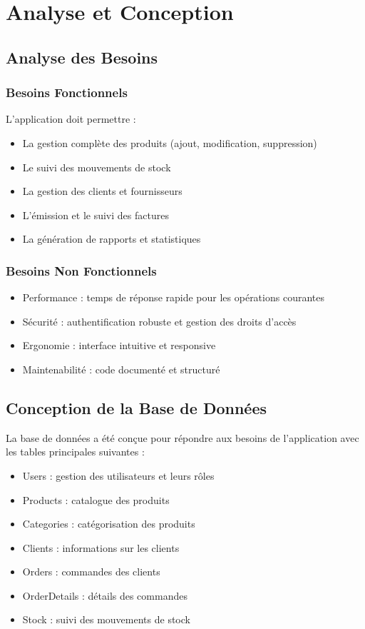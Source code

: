 \documentclass{report}
\begin{document}
\chapter{Analyse et Conception}

\section{Analyse des Besoins}
\subsection{Besoins Fonctionnels}
L'application doit permettre :
\begin{itemize}
    \item La gestion complète des produits (ajout, modification, suppression)
    \item Le suivi des mouvements de stock
    \item La gestion des clients et fournisseurs
    \item L'émission et le suivi des factures
    \item La génération de rapports et statistiques
\end{itemize}

\subsection{Besoins Non Fonctionnels}
\begin{itemize}
    \item Performance : temps de réponse rapide pour les opérations courantes
    \item Sécurité : authentification robuste et gestion des droits d'accès
    \item Ergonomie : interface intuitive et responsive
    \item Maintenabilité : code documenté et structuré
\end{itemize}

\section{Conception de la Base de Données}
La base de données a été conçue pour répondre aux besoins de l'application avec les tables principales suivantes :

\begin{itemize}
    \item Users : gestion des utilisateurs et leurs rôles
    \item Products : catalogue des produits
    \item Categories : catégorisation des produits
    \item Clients : informations sur les clients
    \item Orders : commandes des clients
    \item OrderDetails : détails des commandes
    \item Stock : suivi des mouvements de stock
\end{itemize}
\end{document}
